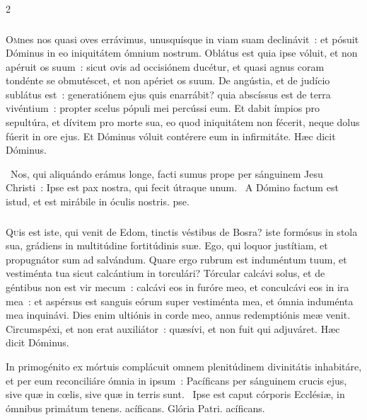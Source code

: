 \documentclass[9pt,twoside]{extarticle}
\begin{document}
\begin{multicols}{2}
\subsubsection*{\center {}}
\lettrine{O}mnes nos quasi oves errávimus, unusquísque in viam suam declinávit~: et pósuit Dóminus in eo iniquitátem ómnium nostrum.
Oblátus est quia ipse vóluit, et non apéruit os suum~: sicut ovis ad occisiónem ducétur, et quasi agnus coram tondénte se obmutéscet, et non apériet os suum.
De angústia, et de judício sublátus est~: generatiónem ejus quis enarrábit? quia abscíssus est de terra vivéntium~: propter scelus pópuli mei percússi eum.
Et dabit ímpios pro sepultúra, et dívitem pro morte sua, eo quod iniquitátem non fécerit, neque dolus fúerit in ore ejus.
Et Dóminus vóluit contérere eum in infirmitáte. Hæc dicit Dóminus.

\begin{tightlist}{}
\item {}~Nos, qui aliquándo erámus longe, facti sumus prope per sánguinem Jesu Christi~: \textred{*} Ipse est pax nostra, qui fecit útraque unum. ~A Dómino factum est istud, et est mirábile in óculis nostris. pse.
\end{tightlist}

\subsubsection*{\center {}}
\lettrine{Q}uis est iste, qui venit de Edom, tinctis véstibus de Bosra? iste formósus in stola sua, grádiens in multitúdine fortitúdinis suæ. Ego, qui loquor justítiam, et propugnátor sum ad salvándum.
Quare ergo rubrum est induméntum tuum, et vestiménta tua sicut calcántium in torculári?
Tórcular calcávi solus, et de géntibus non est vir mecum~: calcávi eos in furóre meo, et conculcávi eos in ira mea~: et aspérsus est sanguis eórum super vestiménta mea, et ómnia induménta mea inquinávi.
Dies enim ultiónis in corde meo, annus redemptiónis meæ venit.
Circumspéxi, et non erat auxiliátor~: quæsívi, et non fuit qui adjuváret. Hæc dicit Dóminus.

\begin{tightlist}{}
\item {}In primogénito ex mórtuis complácuit omnem plenitúdinem divinitátis inhabitáre, et per eum reconciliáre ómnia in ipsum~: \textred{*} Pacíficans per sánguinem crucis ejus, sive quæ in cœlis, sive quæ in terris sunt. ~Ipse est caput córporis Ecclésiæ, in ómnibus primátum tenens. acíficans. Glória Patri. acíficans.
\end{tightlist}


\end{multicols}
\end{document}
